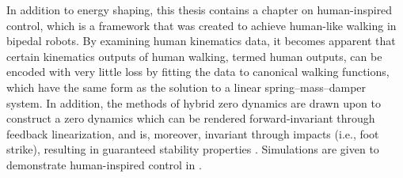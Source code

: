 In addition to energy shaping, this thesis contains a chapter on human-inspired
control, which is a framework that was created to achieve human-like walking in
bipedal robots.
%
By examining human kinematics data, it becomes apparent that certain
kinematics outputs of human walking, termed human outputs, can be encoded with
very little loss by fitting the data to canonical walking functions, which have
the same form as the solution to a linear spring--mass--damper system.
%
In addition, the methods of hybrid zero dynamics \cite{Morris2005} are drawn
upon to construct a zero dynamics which can be rendered forward-invariant
through feedback linearization, and is, moreover, invariant through impacts
(i.e., foot strike), resulting in guaranteed stability properties
\cite{Ames2012}.
%
Simulations are given to demonstrate human-inspired control in
.